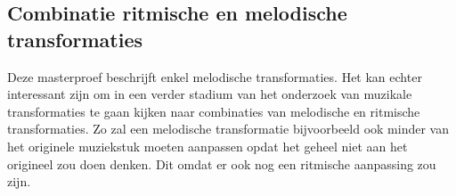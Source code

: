 \subsection{Combinatie ritmische en melodische transformaties}
Deze masterproef beschrijft enkel melodische transformaties. Het kan echter interessant zijn om in een verder stadium van het onderzoek van muzikale transformaties te gaan kijken naar combinaties van melodische en ritmische transformaties. Zo zal een melodische transformatie bijvoorbeeld ook minder van het originele muziekstuk moeten aanpassen opdat het geheel niet aan het origineel zou doen denken. Dit omdat er ook nog een ritmische aanpassing zou zijn.

